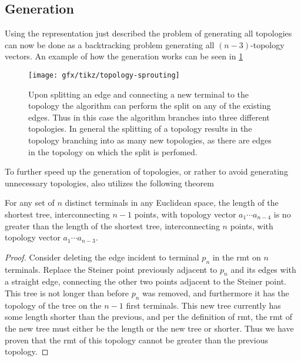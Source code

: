 \subsection{Generation}
\label{sec:generation}

Using the representation just described the problem of generating all topologies
can now be done as a backtracking problem generating all $(n-3)$-topology
vectors. An example of how the generation works can be seen in
\cref{fig:topology-sprouting}

\begin{figure}[htbp]
  \centering
  \texttt{[image: gfx/tikz/topology-sprouting]}
  \caption[Splitting of an edge]{Upon splitting an edge and connecting a new
    terminal to the topology the algorithm can perform the split on any of the
    existing edges. Thus in this case the algorithm branches into three
    different topologies. In general the splitting of a topology results in the topology
    branching into as many new topologies, as there are edges in the topology on which
    the split is perfomed.\label{fig:topology-sprouting}}
\end{figure}

To further speed up the generation of topologies, or rather to avoid generating
unnecessary topologies, \citeauthor{smith1992} also utilizes the following theorem
%
\begin{theorem}
  For any set of $n$ distinct terminals in any Euclidean space, the length of
  the shortest tree, interconnecting $n-1$ points, with topology vector
  $a_1 \cdots a_{n-4}$ is no greater than the length of the shortest tree,
  interconnecting $n$ points, with topology vector $a_1 \cdots a_{n-3}$.
\end{theorem}
%
\begin{proof}
  Consider deleting the edge incident to terminal $p_n$ in the \ac{rmt} on $n$
  terminals. Replace the Steiner point previously adjacent to $p_n$ and its
  edges with a straight edge, connecting the other two points adjacent to the
  Steiner point. This tree is not longer than before $p_n$ was removed, and
  furthermore it has the topology of the tree on the $n-1$ first terminals. This
  new tree currently has some length shorter than the previous, and per the
  definition of \ac{rmt}, the \ac{rmt} of the new tree must either be the length
  or the new tree or shorter. Thus we have proven that the \ac{rmt} of this
  topology cannot be greater than the previous topology.
\end{proof}

